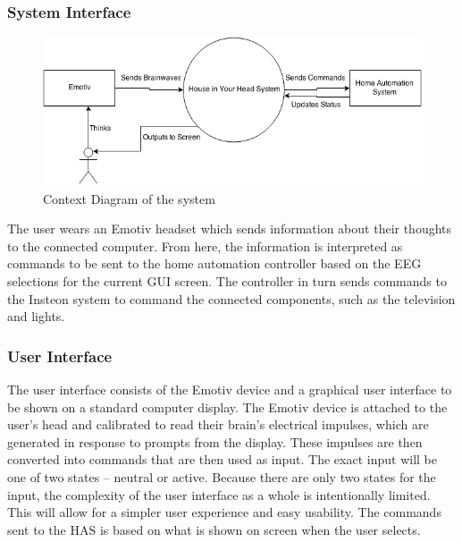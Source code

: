 \documentclass{article}
\begin{document}
\subsubsection{System Interface}

\begin{figure}[h!]
\includegraphics[width=\textwidth]{Senior_Design_Context_Diagram_V1.png}
\caption{Context Diagram of the system}
\label{fig:contextdia}
\end{figure}

The user wears an Emotiv headset which sends information about their thoughts
to the connected computer. From here, the information is interpreted as
commands to be sent to the home automation controller based on the EEG selections for the current GUI screen. The controller in turn sends 
commands to the Insteon system to command the connected components, such as the television and lights.

\subsubsection{User Interface}
The user interface consists of the Emotiv device and a graphical user
interface to be shown on a standard computer display. The Emotiv device is
attached to the user's head and calibrated to read their brain's electrical impulses, which are generated in response to prompts from the display. These impulses are
then converted into commands that are then used as input. The exact input will
be one of two states – neutral or active. Because there are only two states
for the input, the complexity of the user interface as a whole is
intentionally limited. This will allow for a simpler user experience and
easy usability. The commands sent to the HAS is based on what is shown on screen when the user selects.
\end{document}
